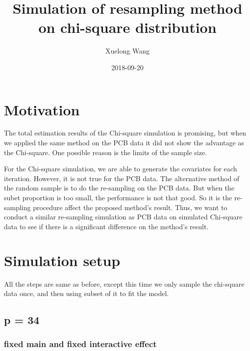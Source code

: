 \documentclass[]{article}
\title{Simulation of resampling method on chi-square distribution}
\author{Xuelong Wang}
\date{2018-09-20}
\begin{document}
\maketitle

{
\setcounter{tocdepth}{2}
\tableofcontents
}
\section{Motivation}\label{motivation}

The total estimation results of the Chi-square simulation is promising,
but when we applied the same method on the PCB data it did not show the
advantage as the Chi-square. One possible reason is the limits of the
sample size.

For the Chi-square simulation, we are able to generate the covariates
for each iteration. However, it is not true for the PCB data. The
alternative method of the random sample is to do the re-sampling on the
PCB data. But when the subet proportion is too small, the performance is
not that good. So it is the re-sampling procedure affect the proposed
method's result. Thus, we want to conduct a similar re-sampling
simulation as PCB data on simulated Chi-square data to see if there is a
significant difference on the method's result.

\section{Simulation setup}\label{simulation-setup}

All the steps are same as before, except this time we only sample the
chi-square data once, and then using subset of it to fit the model.

\subsection{p = 34}\label{p-34}

\subsubsection{fixed main and fixed interactive
effect}\label{fixed-main-and-fixed-interactive-effect}
\end{document}

